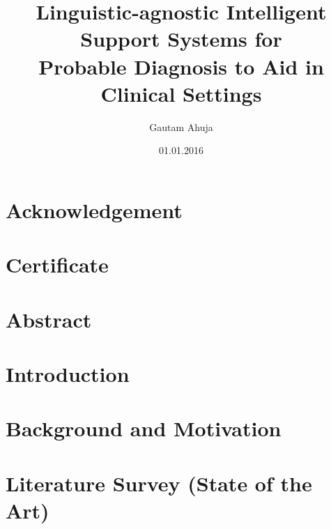 \documentclass[%
]{tumDiss}
\title{%
  Linguistic-agnostic Intelligent Support Systems for\\
   Probable Diagnosis to Aid in Clinical Settings\\
}
\author{Gautam Ahuja}
\date{01.01.2016}
\begin{document}
\frontmatter
\maketitle


\chapter{Acknowledgement}



\chapter{Certificate}



\chapter{Abstract}



\tableofcontents
\listoffigures
\listoftables
\printglossary[type=\acronymtype, nonumberlist]


\mainmatter
\chapter{Introduction}
\label{chap:introduction}



\chapter{Background and Motivation}
\label{chap:bcgmot}



\chapter{Literature Survey (State of the Art)}
\label{chap:sota}



\end{document}
